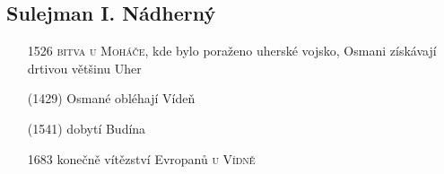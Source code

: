 \documentclass{article}
\begin{document}
\subsection*{Sulejman I. Nádherný}
\begin{itemize}
    \vspace{-0.5em}
    \setlength\itemsep{0.15em}
    \item[1526] \textsc{bitva u Moháče}, kde bylo poraženo uherské vojsko, Osmani získávají drtivou většinu Uher
    \item[(1429)] Osmané obléhají Vídeň
    \item[(1541)] dobytí Budína
    \item[1683] konečně vítězství Evropanů \textsc{u Vídně}
\end{itemize}
\end{document}

